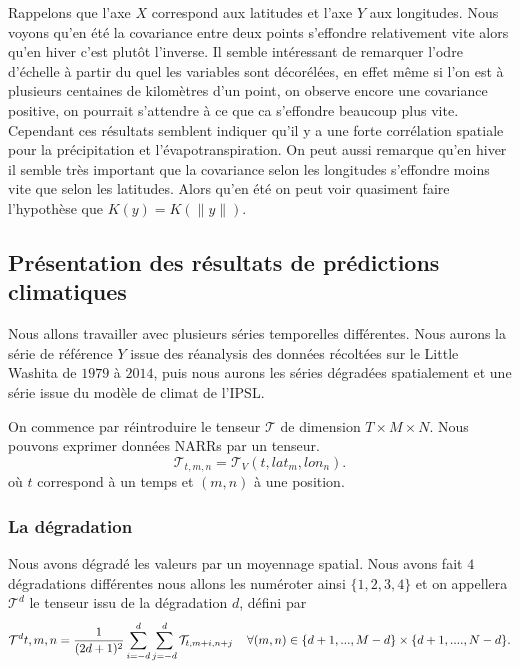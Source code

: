 \documentclass[a4paper,10pt]{article}
\begin{document}
	Rappelons que l'axe $X$ correspond aux latitudes et l'axe $Y$ aux longitudes. Nous voyons qu'en été la covariance entre deux points s'effondre relativement vite alors qu'en hiver c'est plutôt l'inverse.
	Il semble intéressant de remarquer l'odre d'échelle à partir du quel les variables sont décorélées, en effet même si l'on est à plusieurs centaines de kilomètres d'un point, on observe encore une covariance positive, on pourrait s'attendre à ce que ca s'effondre beaucoup plus vite. Cependant ces résultats semblent indiquer qu'il y a une forte corrélation spatiale pour la précipitation et l'évapotranspiration. On peut aussi remarque qu'en hiver il semble très important que la covariance selon les longitudes s'effondre moins vite que selon les latitudes. Alors qu'en été on peut voir quasiment faire l'hypothèse que $K(y)=K(\|y\|)$. 
	
	\subsection{Présentation des résultats de prédictions climatiques}
	\label{ch pr-res-clim}
	Nous allons travailler avec plusieurs séries temporelles différentes. Nous aurons la série de référence $Y$ issue des réanalysis des données récoltées sur le Little Washita de $1979$ à $2014$, puis nous aurons les séries dégradées spatialement et une série issue du modèle de climat de l'IPSL.
	
	On commence par réintroduire le tenseur $\mathcal{T}$ de dimension $T \times M\times N$. Nous pouvons exprimer données NARRs par un tenseur. 
	\[\mathcal{T}_{t,m,n}=\mathcal{T}_V(t,lat_m,lon_n).\]
	où $t$ correspond à un temps et $(m,n)$ à une position.
	
	\subsubsection{La dégradation}
	\label{ch deg-spat}
	
	Nous avons dégradé les valeurs par un moyennage spatial. Nous avons fait $4$ dégradations différentes nous allons les numéroter ainsi $\{1,2,3,4\}$ et on appellera $\mathcal{T}^{d}$ le tenseur issu de la dégradation $d$, défini par
	\begin{equation}
		\label{eq-degradation}
		\mathcal{T}^{d}{t,m,n}=\frac{1}{(2d+1)^2} \sum_{i=-d}^{d}\sum_{j=-d}^{d}\mathcal{T}_{t,m+i,n+j} \hspace{4mm} \forall (m,n) \in \{d+1,...,M-d\}\times\{d+1,...., N-d\}. 
	\end{equation}
	
\end{document}
